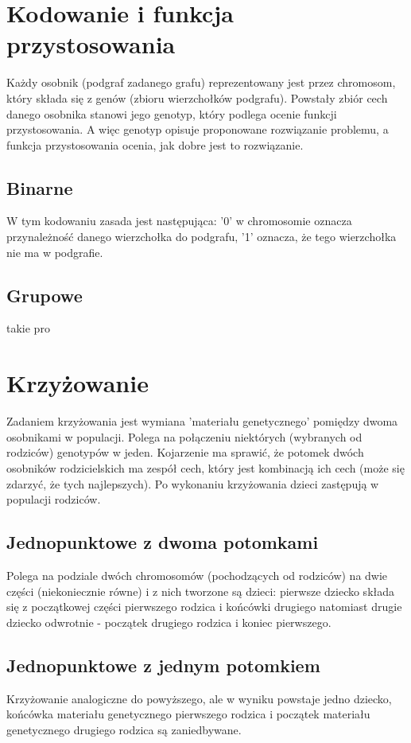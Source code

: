 \documentclass[11pt]{aghdpl}
\begin{document}
\chapter{Kodowanie i funkcja przystosowania}
\label{cha:encoding}
Każdy osobnik (podgraf zadanego grafu) reprezentowany jest przez chromosom, który składa się z genów (zbioru wierzchołków podgrafu). Powstały zbiór cech danego osobnika stanowi jego genotyp, który podlega ocenie funkcji przystosowania. A więc genotyp opisuje proponowane rozwiązanie problemu, a funkcja przystosowania ocenia, jak
dobre jest to rozwiązanie.
\section{Binarne}
\label{sec:binary}
W tym kodowaniu zasada jest następująca: '0' w chromosomie oznacza przynależność danego wierzchołka do podgrafu, '1' oznacza, że tego wierzchołka nie ma w podgrafie.
\section{Grupowe}
\label{sec:group}
takie pro

\chapter{Krzyżowanie}
\label{cha:crossing}
Zadaniem krzyżowania jest wymiana 'materiału genetycznego' pomiędzy dwoma osobnikami w populacji. Polega na połączeniu niektórych (wybranych od rodziców) genotypów w jeden. Kojarzenie ma sprawić, że potomek dwóch osobników rodzicielskich ma zespół cech, który jest kombinacją ich cech (może się zdarzyć, że tych najlepszych). Po wykonaniu krzyżowania dzieci zastępują w populacji rodziców. 
 
\section{Jednopunktowe z dwoma potomkami}
\label{sec:jedenDwa}
Polega na podziale dwóch chromosomów (pochodzących od rodziców) na dwie części (niekoniecznie równe) i z nich tworzone są dzieci: pierwsze dziecko składa się z początkowej części pierwszego rodzica i końcówki drugiego natomiast drugie dziecko odwrotnie - początek drugiego rodzica i koniec pierwszego.

\section{Jednopunktowe z jednym potomkiem}
\label{sec:jedenJeden}
Krzyżowanie analogiczne do powyższego, ale w wyniku powstaje jedno dziecko, końcówka materiału genetycznego pierwszego rodzica i początek materiału genetycznego drugiego rodzica są zaniedbywane.
\end{document}
